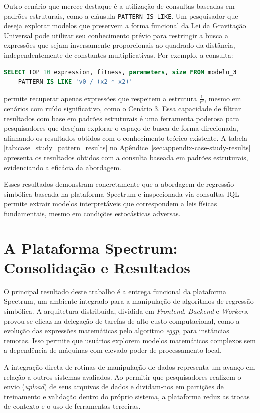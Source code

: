 Outro cenário que merece destaque é a utilização de consultas baseadas em padrões estruturais, como a cláusula \texttt{PATTERN IS LIKE}. Um pesquisador que deseja explorar modelos que preservem a forma funcional da Lei da Gravitação Universal pode utilizar seu conhecimento prévio para restringir a busca a expressões que sejam inversamente proporcionais ao quadrado da distância, independentemente de constantes multiplicativas. Por exemplo, a consulta:
\begin{lstlisting}[language=SQL]
    SELECT TOP 10 expression, fitness, parameters, size FROM modelo_3
    PATTERN IS LIKE 'v0 / (x2 * x2)'
\end{lstlisting}
permite recuperar apenas expressões que respeitem a estrutura $\frac{1}{r^2}$, mesmo em cenários com ruído significativo, como o Cenário 3. Essa capacidade de filtrar resultados com base em padrões estruturais é uma ferramenta poderosa para pesquisadores que desejam explorar o espaço de busca de forma direcionada, alinhando os resultados obtidos com o conhecimento teórico existente. A tabela \ref{tab:case_study_pattern_results} no Apêndice~\ref{sec:appendix-case-study-results} apresenta os resultados obtidos com a consulta baseada em padrões estruturais, evidenciando a eficácia da abordagem.

Esses resultados demonstram concretamente que a abordagem de regressão simbólica baseada na plataforma Spectrum e inspecionada via consultas IQL permite extrair modelos interpretáveis que correspondem a leis físicas fundamentais, mesmo em condições estocásticas adversas.

\section{A Plataforma Spectrum: Consolidação e Resultados}
\label{sec:results_spectrum}
O principal resultado deste trabalho é a entrega funcional da plataforma Spectrum, um ambiente integrado para a manipulação de algoritmos de regressão simbólica. A arquitetura distribuída, dividida em \textit{Frontend}, \textit{Backend} e \textit{Workers}, provou-se eficaz na delegação de tarefas de alto custo computacional, como a evolução das expressões matemáticas pelo algoritmo \textit{eggp}, para instâncias remotas. Isso permite que usuários explorem modelos matemáticos complexos sem a dependência de máquinas com elevado poder de processamento local.

A integração direta de rotinas de manipulação de dados representa um avanço em relação a outros sistemas avaliados. Ao permitir que pesquisadores realizem o envio (\textit{upload}) de seus arquivos de dados e dividam-nos em partições de treinamento e validação dentro do próprio sistema, a plataforma reduz as trocas de contexto e o uso de ferramentas terceiras.

